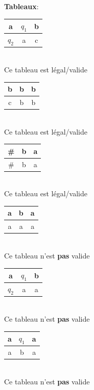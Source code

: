 \documentclass[a4paper,12pt]{article}
\begin{document}
    \textbf{Tableaux}:\\
    \begin{center}
      \begin{minipage}[c]{.4\textwidth}
	\begin{tabular}{|c|c|c|}
	  \hline
	  a     & $q_1$ & b \\ \hline
	  $q_2$ & a     & c \\ \hline
	\end{tabular}\\
	Ce tableau est légal/valide
      \end{minipage}
      \begin{minipage}[c]{.4\textwidth}
	\begin{tabular}{|c|c|c|}
	  \hline
	  b & b & b \\ \hline
	  c & b & b \\ \hline
	\end{tabular}\\
	Ce tableau est légal/valide
      \end{minipage}

      \begin{minipage}[c]{.4\textwidth}
	\begin{tabular}{|c|c|c|}
	  \hline
	  \# & b & a \\ \hline
	  \# & b & a \\ \hline
	\end{tabular}\\
	Ce tableau est légal/valide
      \end{minipage}
      \begin{minipage}[c]{.4\textwidth}
	\begin{tabular}{|c|c|c|}
	  \hline
	  a & b & a \\ \hline
	  a & a & a \\ \hline
	\end{tabular}\\
	Ce tableau n'est \textbf{pas} valide
      \end{minipage}

      \begin{minipage}[c]{.4\textwidth}
	\begin{tabular}{|c|c|c|}
	  \hline
	  a     & $q_1$ & b \\ \hline
	  $q_2$ & a     & a \\ \hline
	\end{tabular}\\
	Ce tableau n'est \textbf{pas} valide
      \end{minipage}
      \begin{minipage}[c]{.4\textwidth}
	\begin{tabular}{|c|c|c|}
	  \hline
	  a & $q_1$ & a \\ \hline
	  a & b     & a \\ \hline
	\end{tabular}\\
	Ce tableau n'est \textbf{pas} valide
      \end{minipage}
    \end{center}
\end{document}
